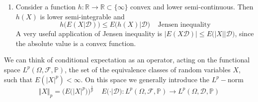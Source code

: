 \begin{proposition}
\begin{enumerate}
        \item Consider a function $h : \mathbb{R} \to \mathbb{R} \subset \{ \infty \}$ convex and lower semi-continuous. Then $h(X)$ is lower semi-integrable and
        \begin{equation}
            h\Big( E(X\vert \mathcal{D}) \Big) \leq E\Big(h(X) \vert \mathcal{D} \Big) \;\;\;\; \text{Jensen inequality}
        \end{equation}
        A very useful application of Jensen inequality is $\big\vert E(X  \mathcal{D}) \big\vert \leq E\big( \vert X \vert \big\vert \mathcal{D} \big)$, since the absolute value is a convex function. 
    \end{enumerate}
\end{proposition}

We can think of conditional expectation as an operator, acting on the functional space $L^p(\Omega,\mathcal{F},\mathbb{P})$, the set of the equivalence classes of random variables $X$, such that $E(\vert X \vert^p) < \infty$. On this space we generally introduce the $L^p-$norm
\begin{equation*}
    \Vert X \Vert_p = \Big( E\big( \vert X \vert^p \big) \Big)^{\frac{1}{p}} \;\;\;\; E\big(\cdot \vert \mathcal{D} \big) : L^p(\Omega, \mathcal{F}, \mathbb{P}) \to L^p(\Omega, \mathcal{D}, \mathbb{P})
\end{equation*}


